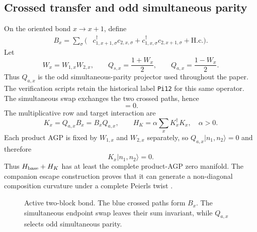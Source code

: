 \documentclass[11pt]{article}
\theoremstyle{definition}
\theoremstyle{remark}
\newcommand{\ket}[1]{\lvert #1\rangle}
\begin{document}
\subsection{Crossed transfer and odd simultaneous parity}

On the oriented bond $x\to x+1$, define
\begin{equation}
\begin{aligned}
 B_x=\sum_\sigma(&c_{1,x+1,\sigma}^\dagger c_{2,x,\sigma}
 +c_{1,x,\sigma}^\dagger c_{2,x+1,\sigma}+\mathrm{H.c.}).
\end{aligned}
\label{eq:Bx}
\end{equation}
Let
\begin{equation}
 W_x=W_{1,x}W_{2,x},
 \qquad
 Q_{s,x}=\frac{1+W_x}{2},
 \qquad
 Q_{a,x}=\frac{1-W_x}{2}.
 \label{eq:Qsa}
\end{equation}
Thus $Q_{a,x}$ is the odd simultaneous-parity projector used throughout the paper.  The verification scripts retain the historical label \texttt{Pi12} for this same operator.
The simultaneous swap exchanges the two crossed paths, hence
\begin{equation}
 [B_x,W_x]=0.
 \label{eq:B-comm-W}
\end{equation}
The multiplicative row and target interaction are
\begin{equation}
 K_x=Q_{a,x}B_x=B_xQ_{a,x},
 \qquad
 H_K=\alpha\sum_xK_x^\dagger K_x,
 \quad \alpha>0.
 \label{eq:K-target}
\end{equation}
Each product AGP is fixed by $W_{1,x}$ and $W_{2,x}$ separately, so $Q_{a,x}\ket{n_1,n_2}=0$ and therefore
\begin{equation}
 K_x\ket{n_1,n_2}=0.
\end{equation}
Thus $H_{\rm base}+H_K$ has at least the complete product-AGP zero manifold.  The companion escape construction proves that it can generate a non-diagonal composition curvature under a complete Peierls twist \cite{SledgianowskiNoGo}.

\begin{figure}[t]
\centering
{}
\caption{Active two-block bond.  The blue crossed paths form $B_x$.  The simultaneous endpoint swap leaves their sum invariant, while $Q_{a,x}$ selects odd simultaneous parity.}
\label{fig:active-bond}
\end{figure}
\end{document}
